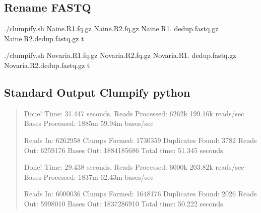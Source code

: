 \documentclass[letterpaper,10pt,english]{sphinxhowto}
\begin{document}
\subsection{Rename FASTQ}
\label{\detokenize{CNV:rename-fastq}}\begin{quote}

\sphinxAtStartPar
{}

\sphinxAtStartPar
{}
\end{quote}

\begin{sphinxVerbatim}[commandchars=\\\{\}]
./clumpify.sh Naine.R1.fq.gz Naine.R2.fq.gz Naine.R1.
dedup.fastq.gz Naine.R2.dedup.fastq.gz t

./clumpify.sh Novaria.R1.fq.gz Novaria.R2.fq.gz Novaria.R1.
dedup.fastq.gz Novaria.R2.dedup.fastq.gz t
\end{sphinxVerbatim}


\subsection{Standard Output Clumpify python}
\label{\detokenize{CNV:standard-output-clumpify-python}}\begin{quote}

\sphinxAtStartPar
Done!
Time:                           31.447 seconds.
Reads Processed:         6262k  199.16k reads/sec
Bases Processed:         1885m  59.94m bases/sec

\sphinxAtStartPar
Reads In:              6262958
Clumps Formed:         1730359
Duplicates Found:         3782
Reads Out:             6259176
Bases Out:          1884185686
Total time:     51.345 seconds.

\sphinxAtStartPar
{}

\sphinxAtStartPar
Done!
Time:                           29.438 seconds.
Reads Processed:         6000k  203.82k reads/sec
Bases Processed:         1837m  62.43m bases/sec

\sphinxAtStartPar
Reads In:              6000036
Clumps Formed:         1648176
Duplicates Found:         2026
Reads Out:             5998010
Bases Out:          1837286910
Total time:     50.222 seconds.
\end{quote}
\end{document}
